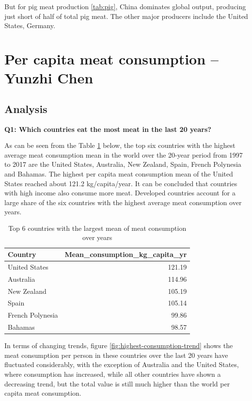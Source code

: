\documentclass[11pt,a4paper,]{article}
\begin{document}
But for pig meat production \ref{tab:pig}, China dominates global output, producing just short of half of total pig meat. The other major producers include the United States, Germany.
\clearpage

\section*{Per capita meat consumption -- Yunzhi Chen}

\subsection*{Analysis}

\textbf{Q1: Which countries eat the most meat in the last 20 years? }

As can be seen from the Table \ref{tab:highest-meanconsumption} below, the top six countries with the highest average meat consumption mean in the world over the 20-year period from 1997 to 2017 are the United States, Australia, New Zealand, Spain, French Polynesia and Bahamas. The highest per capita meat consumption mean of the United States reached about 121.2 kg/capita/year. It can be concluded that countries with high income also consume more meat. Developed countries account for a large share of the six countries with the highest average meat consumption over years.

\begin{table}

\caption{\label{tab:highest-meanconsumption}Top 6 countries with the largest mean of meat consumption over years}
\centering
\begin{tabular}[t]{l|r}
\hline
Country & Mean\_consumption\_kg\_capita\_yr\\
\hline
United States & 121.19\\
\hline
Australia & 114.96\\
\hline
New Zealand & 105.19\\
\hline
Spain & 105.14\\
\hline
French Polynesia & 99.86\\
\hline
Bahamas & 98.57\\
\hline
\end{tabular}
\end{table}
\clearpage

In terms of changing trends, figure \ref{fig:highest-consumption-trend} shows the meat consumption per person in these countries over the last 20 years have fluctuated considerably, with the exception of Australia and the United States, where consumption has increased, while all other countries have shown a decreasing trend, but the total value is still much higher than the world per capita meat consumption.
\end{document}
